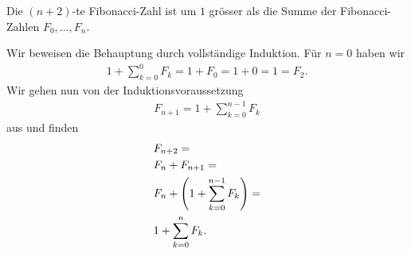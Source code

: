 \begin{myanswer}[myexercise:0309]
\begin{aenum}
    \item Die $(n+2)$-te Fibonacci-Zahl ist um $1$ grösser als die Summe der Fibonacci-Zahlen $F_0,\ldots, F_n$.
    \item Wir beweisen die Behauptung durch vollständige Induktion. Für $n = 0$ haben wir
    \begin{align*}
        1 + \sum_{k=0}^{0} F_k = 1 + F_0 = 1 + 0 = 1 = F_2.
    \end{align*}
    Wir gehen nun von der Induktionsvoraussetzung
    \begin{align*}
        F_{n+1} = 1 + \sum_{k=0}^{n-1} F_k
    \end{align*}
        aus und finden
        \begin{align*}
            &F_{n+2} = \\
            &F_n + F_{n+1} = \\
            &F_n + \left(1 + \sum_{k=0}^{n-1}F_k\right) = \\
            &1 + \sum_{k=0}^{n} F_k.
        \end{align*}
\end{aenum}
\end{myanswer}

\clearpage
\shipoutAnswer
